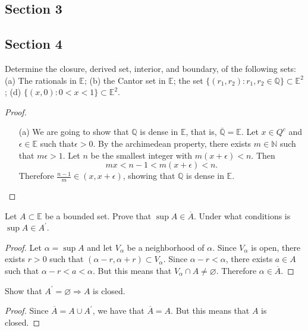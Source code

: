 \documentclass[12pt]{article}
\newcommand{\N}{\mathbb{N}}
\newcommand{\Q}{\mathbb{Q}}
\newcommand{\E}{\mathbb{E}}
\begin{document}
\subsection*{Section 3}


\subsection*{Section 4}
\begin{problem}{1} Determine the closure, derived set, interior, and boundary, of the following sets: (a) The rationals in $\E$; (b) the Cantor set in $\E$; the set $\{(r_1, r_2): r_1, r_2 \in \Q \} \subset \E^2$; (d) $\{(x, 0): 0 < x < 1 \} \subset \E^2$.
\end{problem}
\begin{proof}
    \begin{itemize}
        \item[(a)] We are going to show that $\Q$ is dense in $\E$, that is, $\overline{\Q} = \E.$ Let $x \in Q^c$ and $\epsilon \in \E$ such that$\epsilon > 0.$ By the archimedean property, there exists $m \in \N$ such that $m \epsilon  > 1.$ Let $n$ be the smallest integer with $m(x + \epsilon) < n.$ Then
        $$ mx < n-1 < m(x + \epsilon) < n.$$
        Therefore $\frac{n-1}{m} \in (x, x + \epsilon)$, showing that $\Q$ is dense in $\E.$
    \end{itemize}
\end{proof}

\begin{problem}{3} Let $A \subset \E$ be a bounded set. Prove that $\sup A \in \overline{A}.$ Under what conditions is $\sup A \in A^\prime$.
\end{problem}
\begin{proof} %
Let $\alpha = \sup A$ and let $V_\alpha$ be a neighborhood of $\alpha.$ Since $V_\alpha$ is open, there exists $r > 0$ such that $(\alpha - r, \alpha + r) \subset V_\alpha.$ Since $\alpha - r < \alpha$, there exists $a \in A$ such that $\alpha - r < a < \alpha.$ But this means that $V_\alpha \cap A \neq \varnothing.$ Therefore $\alpha \in \overline{A}.$
\end{proof}

\begin{problem}{5}
Show that $A^\prime = \varnothing \Rightarrow A$ is closed.
\end{problem}
\begin{proof}
    Since $\overline{A} = A \cup A^\prime$, we have that $\overline{A} = A.$ But this means that $A$ is closed.
\end{proof}
\end{document}
